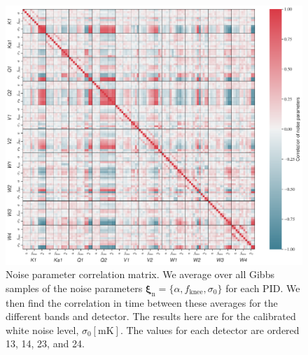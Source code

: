 \documentclass[twocolumn]{../../common/aa}
\begin{document}
\begin{figure}[t]
	\centering
	\includegraphics[width=\textwidth]{figures/noise_parameter_correlation.pdf}
	\caption{Noise parameter correlation matrix. We average over all Gibbs samples of the noise parameters $\boldsymbol\xi_\mathrm n=\{\alpha,f_\mathrm{knee},\sigma_0\}$ for each PID. We then find the correlation in time between these averages for the different bands and detector. The results here are for the calibrated white noise level, $\sigma_0[\mathrm{mK}]$. The values for each detector are ordered 13, 14, 23, and 24.}
	\label{fig:correlation}
\end{figure}
\end{document}

